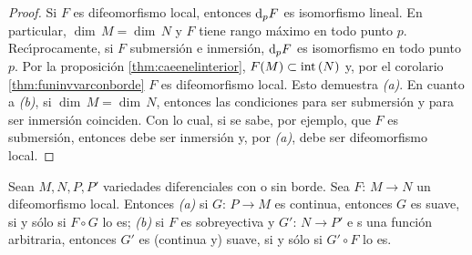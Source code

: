 \begin{proof}
	Si $F$ es difeomorfismo local, entonces $\diferencial[p]{F}$ es
	isomorfismo lineal. En particular, $\dim\,M=\dim\,N$ y $F$
	tiene rango m\'{a}ximo en todo punto $p$. Rec\'{\i}procamente, si $F$
	submersi\'{o}n e inmersi\'{o}n, $\diferencial[p]{F}$ es isomorfismo
	en todo punto $p$. Por la proposici\'{o}n \ref{thm:caeenelinterior},
	$F(M)\subset\mathrm{int}\left(N\right)$ y, por el corolario
	\ref{thm:funinvvarconborde} $F$ es difeomorfismo local. Esto
	demuestra \emph{(a)}. En cuanto a \emph{(b)}, si $\dim\,M=\dim\,N$,
	entonces las condiciones para ser submersi\'{o}n y para ser
	inmersi\'{o}n coinciden. Con lo cual, si se sabe, por ejemplo, que
	$F$ es submersi\'{o}n, entonces debe ser inmersi\'{o}n y, por
	\emph{(a)}, debe ser difeomorfismo local.
\end{proof}

\begin{propoDifeoLocalExtra}\label{thm:propisextradifeoslocales}
	Sean $M,N,P,P'$ variedades diferenciales con o sin borde. Sea
	$F:\,M\rightarrow N$ un difeomorfismo local. Entonces
	\emph{(a)} si $G:\,P\rightarrow M$ es continua, entonces
	$G$ es suave, si y s\'{o}lo si $F\circ G$ lo es; \emph{(b)} si
	$F$ es sobreyectiva y $G':\,N\rightarrow P'$ e s una funci\'{o}n
	arbitraria, entonces $G'$ es (continua y) suave, si y s\'{o}lo si
	$G'\circ F$ lo es.
\end{propoDifeoLocalExtra}

